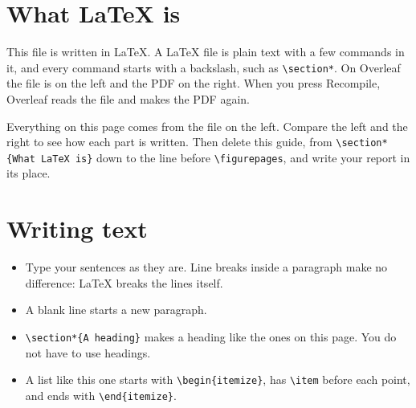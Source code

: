 \documentclass[11pt]{article}
\begin{document}
\makeheader


\section*{What LaTeX is}

This file is written in LaTeX. A LaTeX file is plain text with a few commands
in it, and every command starts with a backslash, such as \verb|\section*|. On
Overleaf the file is on the left and the PDF on the right. When you press
Recompile, Overleaf reads the file and makes the PDF again.

Everything on this page comes from the file on the left. Compare the left and
the right to see how each part is written. Then delete this guide, from
\verb|\section*{What LaTeX is}| down to the line before \verb|\figurepages|,
and write your report in its place.

\section*{Writing text}

\begin{itemize}
  \item Type your sentences as they are. Line breaks inside a paragraph make no
    difference: LaTeX breaks the lines itself.
  \item A blank line starts a new paragraph.
  \item \verb|\section*{A heading}| makes a heading like the ones on this page.
    You do not have to use headings.
  \item A list like this one starts with \verb|\begin{itemize}|, has
    \verb|\item| before each point, and ends with \verb|\end{itemize}|.
\end{itemize}
\end{document}
